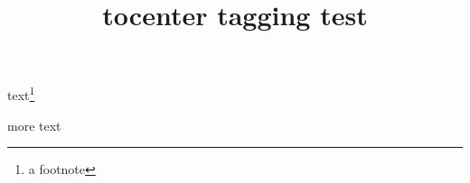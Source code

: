 \documentclass{article}
\title{tocenter tagging test}
\begin{document}
text\footnote{a footnote}

more text

\kant[1-6]
\end{document}

